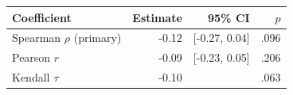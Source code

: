 \begin{tabular}{lrrr}
\toprule
Coefficient & Estimate & 95\% CI & $p$ \\
\midrule
Spearman $\rho$ (primary) & -0.12 & [-0.27, 0.04] & .096 \\
Pearson $r$ & -0.09 & [-0.23, 0.05] & .206 \\
Kendall $\tau$ & -0.10 &  & .063 \\
\bottomrule
\end{tabular}
